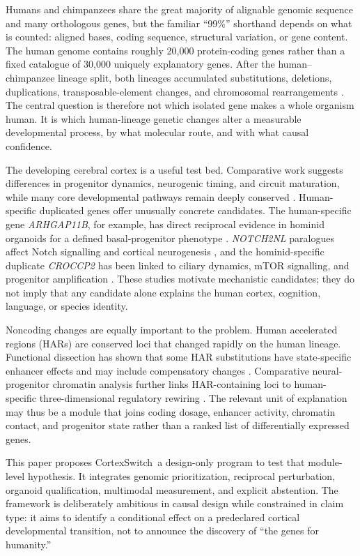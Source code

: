 \documentclass[conference]{IEEEtran}
\newcommand{\csw}{CortexSwitch}
\begin{document}
Humans and chimpanzees share the great majority of alignable genomic sequence and many orthologous genes, but the familiar ``99\%'' shorthand depends on what is counted: aligned bases, coding sequence, structural variation, or gene content. The human genome contains roughly 20,000 protein-coding genes rather than a fixed catalogue of 30,000 uniquely explanatory genes. After the human--chimpanzee lineage split, both lineages accumulated substitutions, deletions, duplications, transposable-element changes, and chromosomal rearrangements \cite{sunt2020}. The central question is therefore not which isolated gene makes a whole organism human. It is which human-lineage genetic changes alter a measurable developmental process, by what molecular route, and with what causal confidence.

The developing cerebral cortex is a useful test bed. Comparative work suggests differences in progenitor dynamics, neurogenic timing, and circuit maturation, while many core developmental pathways remain deeply conserved \cite{libe2021,vander2023}. Human-specific duplicated genes offer unusually concrete candidates. The human-specific gene \emph{ARHGAP11B}, for example, has direct reciprocal evidence in hominid organoids for a defined basal-progenitor phenotype \cite{fischer2022}. \emph{NOTCH2NL} paralogues affect Notch signalling and cortical neurogenesis \cite{fiddes2018}, and the hominid-specific duplicate \emph{CROCCP2} has been linked to ciliary dynamics, mTOR signalling, and progenitor amplification \cite{croccp2}. These studies motivate mechanistic candidates; they do not imply that any candidate alone explains the human cortex, cognition, language, or species identity.

Noncoding changes are equally important to the problem. Human accelerated regions (HARs) are conserved loci that changed rapidly on the human lineage. Functional dissection has shown that some HAR substitutions have state-specific enhancer effects and may include compensatory changes \cite{whalen2023}. Comparative neural-progenitor chromatin analysis further links HAR-containing loci to human-specific three-dimensional regulatory rewiring \cite{keough2023}. The relevant unit of explanation may thus be a module that joins coding dosage, enhancer activity, chromatin contact, and progenitor state rather than a ranked list of differentially expressed genes.

This paper proposes \csw{}~a design-only program to test that module-level hypothesis. It integrates genomic prioritization, reciprocal perturbation, organoid qualification, multimodal measurement, and explicit abstention. The framework is deliberately ambitious in causal design while constrained in claim type: it aims to identify a conditional effect on a predeclared cortical developmental transition, not to announce the discovery of ``the genes for humanity.''
\end{document}
